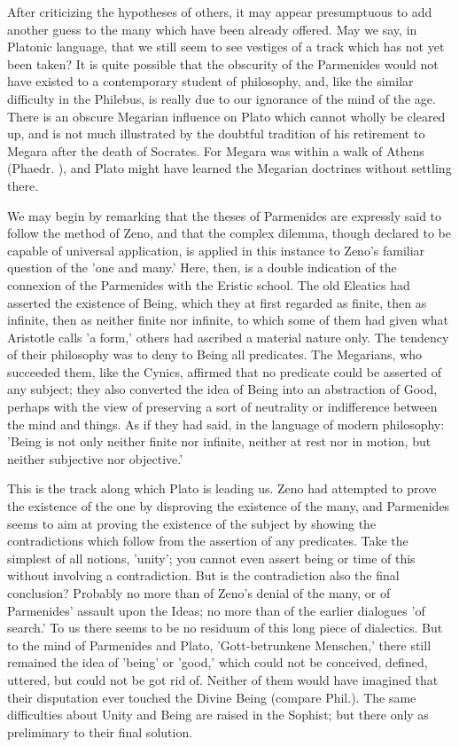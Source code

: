 \documentclass[11pt,letter]{article}
\begin{document}
\par  After criticizing the hypotheses of others, it may appear presumptuous to add another guess to the many which have been already offered. May we say, in Platonic language, that we still seem to see vestiges of a track which has not yet been taken? It is quite possible that the obscurity of the Parmenides would not have existed to a contemporary student of philosophy, and, like the similar difficulty in the Philebus, is really due to our ignorance of the mind of the age. There is an obscure Megarian influence on Plato which cannot wholly be cleared up, and is not much illustrated by the doubtful tradition of his retirement to Megara after the death of Socrates. For Megara was within a walk of Athens (Phaedr. ), and Plato might have learned the Megarian doctrines without settling there.

\par  We may begin by remarking that the theses of Parmenides are expressly said to follow the method of Zeno, and that the complex dilemma, though declared to be capable of universal application, is applied in this instance to Zeno's familiar question of the 'one and many.' Here, then, is a double indication of the connexion of the Parmenides with the Eristic school. The old Eleatics had asserted the existence of Being, which they at first regarded as finite, then as infinite, then as neither finite nor infinite, to which some of them had given what Aristotle calls 'a form,' others had ascribed a material nature only. The tendency of their philosophy was to deny to Being all predicates. The Megarians, who succeeded them, like the Cynics, affirmed that no predicate could be asserted of any subject; they also converted the idea of Being into an abstraction of Good, perhaps with the view of preserving a sort of neutrality or indifference between the mind and things. As if they had said, in the language of modern philosophy: 'Being is not only neither finite nor infinite, neither at rest nor in motion, but neither subjective nor objective.'

\par  This is the track along which Plato is leading us. Zeno had attempted to prove the existence of the one by disproving the existence of the many, and Parmenides seems to aim at proving the existence of the subject by showing the contradictions which follow from the assertion of any predicates. Take the simplest of all notions, 'unity'; you cannot even assert being or time of this without involving a contradiction. But is the contradiction also the final conclusion? Probably no more than of Zeno's denial of the many, or of Parmenides' assault upon the Ideas; no more than of the earlier dialogues 'of search.' To us there seems to be no residuum of this long piece of dialectics. But to the mind of Parmenides and Plato, 'Gott-betrunkene Menschen,' there still remained the idea of 'being' or 'good,' which could not be conceived, defined, uttered, but could not be got rid of. Neither of them would have imagined that their disputation ever touched the Divine Being (compare Phil.). The same difficulties about Unity and Being are raised in the Sophist; but there only as preliminary to their final solution.
\end{document}
